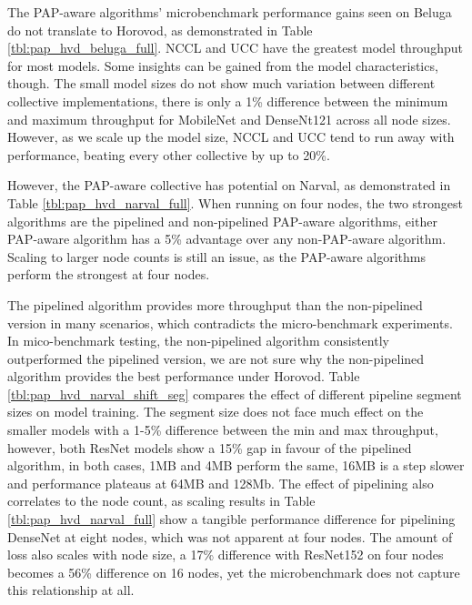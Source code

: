 

The \gls{PAP}-aware algorithms' microbenchmark performance gains seen on Beluga do not translate to Horovod, as demonstrated in Table \ref{tbl:pap_hvd_beluga_full}.
\gls{NCCL} and \gls{UCC} have the greatest model throughput for most models.
Some insights can be gained from the model characteristics, though.
The small model sizes do not show much variation between different collective implementations, there is only a 1\% difference between the minimum and maximum throughput for MobileNet and DenseNt121 across all node sizes. 
However, as we scale up the model size, \gls{NCCL} and \gls{UCC} tend to run away with performance, beating every other collective by up to 20\%.

However, the \gls{PAP}-aware collective has potential on Narval, as demonstrated in Table \ref{tbl:pap_hvd_narval_full}.
When running on four nodes, the two strongest algorithms are the pipelined and non-pipelined \gls{PAP}-aware algorithms, either \gls{PAP}-aware algorithm has a 5\% advantage over any non-\gls{PAP}-aware algorithm.
Scaling to larger node counts is still an issue, as the \gls{PAP}-aware algorithms perform the strongest at four nodes.



The pipelined algorithm provides more throughput than the non-pipelined version in many scenarios, which contradicts the micro-benchmark experiments.
In mico-benchmark testing, the non-pipelined algorithm consistently outperformed the pipelined version, we are not sure why the non-pipelined algorithm provides the best performance under Horovod.
Table \ref{tbl:pap_hvd_narval_shift_seg} compares the effect of different pipeline segment sizes on model training.
The segment size does not face much effect on the smaller models with a 1-5\% difference between the min and max throughput, however, both ResNet models show a 15\% gap in favour of the pipelined algorithm, in both cases, 1MB and 4MB perform the same, 16MB is a step slower and performance plateaus at 64MB and 128Mb.
The effect of pipelining also correlates to the node count, as scaling results in Table \ref{tbl:pap_hvd_narval_full} show a tangible performance difference for pipelining DenseNet at eight nodes, which was not apparent at four nodes.
The amount of loss also scales with node size, a 17\% difference with ResNet152 on four nodes becomes a 56\% difference on 16 nodes, yet the microbenchmark does not capture this relationship at all.

